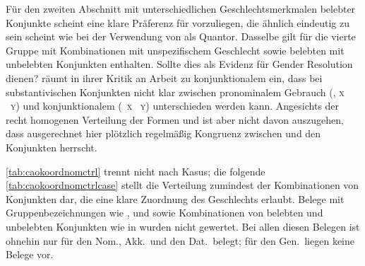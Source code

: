 Für den zweiten Abschnitt mit unterschiedlichen Geschlechtsmerkmalen belebter
Konjunkte scheint eine klare Präferenz für  vorzuliegen, die
ähnlich eindeutig zu sein scheint wie bei der Verwendung von  als
Quantor. Dasselbe gilt für die vierte Gruppe mit Kombinationen mit
unspezifischem Geschlecht sowie belebten mit unbelebten Konjunkten enthalten.
Sollte dies als Evidenz für Gender Resolution dienen? \citet[187]{gjelsten1980}
räumt in ihrer Kritik an  Arbeit zu konjunktionalem
 ein, dass bei substantivischen Konjunkten nicht klar zwischen
pronominalem Gebrauch (, \textsc{x} ~\textsc{y}) und
konjunktionalem (~\textsc{x} ~\textsc{y}) unterschieden
werden kann. Angesichts der recht homogenen Verteilung der Formen 
und  ist aber nicht davon auszugehen, dass ausgerechnet hier
plötzlich regelmäßig Kongruenz zwischen  und den Konjunkten
herrscht.

\cref{tab:caokoordnomctrl} trennt nicht nach Kasus; die folgende
\cref{tab:caokoordnomctrlcase} stellt die Verteilung zumindest der
Kombinationen von Konjunkten dar, die eine klare Zuordnung des Geschlechts
erlaubt. Belege mit Gruppenbezeichnungen wie  ,   und   sowie Kombinationen von
belebten und unbelebten Konjunkten wie in   wurden nicht gewertet. Bei allen diesen Belegen ist
ohnehin nur  für den Nom., Akk.\ und den Dat.\ belegt; für den
Gen.\ liegen keine Belege vor.

